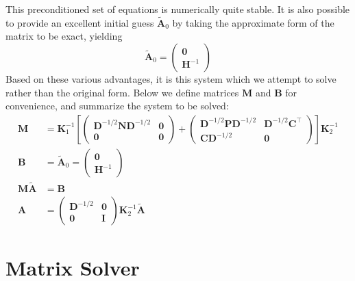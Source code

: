 This preconditioned set of equations is numerically quite stable.  It is also possible to provide an excellent initial guess $\mathbf{\widetilde{A}}_0$ by taking the approximate form of the matrix to be exact, yielding
\begin{equation}
\mathbf{\widetilde{A}}_0 = \begin{pmatrix}\mathbf{0}\\ \mathbf{H}^{-1}\end{pmatrix}
\end{equation}
Based on these various advantages, it is this system which we attempt to solve rather than the original form.  Below we define matrices $\mathbf{M}$ and $\mathbf{B}$ for convenience, and summarize the system to be solved:
\begin{subequations}\begin{align}
\mathbf{M} &= \mathbf{K}_1^{-1} 
\left[
\begin{pmatrix}\mathbf{D}^{-1/2}\mathbf{ND}^{-1/2}&\mathbf{0}\\ \mathbf{0}&\mathbf{0}\end{pmatrix}
+
\begin{pmatrix}\mathbf{D}^{-1/2}\mathbf{PD}^{-1/2}&\mathbf{D}^{-1/2}\mathbf{C}^\top \\ \mathbf{CD}^{-1/2}&\mathbf{0}\end{pmatrix}
\right]
\mathbf{K}_2^{-1}\\
\mathbf{B} &= \mathbf{\widetilde{A}}_0 = \begin{pmatrix}\mathbf{0}\\ \mathbf{H}^{-1}\end{pmatrix}\\
\mathbf{M\widetilde{A}} &= \mathbf{B}\\
\mathbf{A} &= \begin{pmatrix}\mathbf{D}^{-1/2}&\mathbf{0}\\ \mathbf{0}&\mathbf{I}\end{pmatrix}\mathbf{K}_2^{-1}\mathbf{\widetilde{A}}
\end{align}\end{subequations}


\section{Matrix Solver}\label{sec:MatrixSolverAlgorithm}

